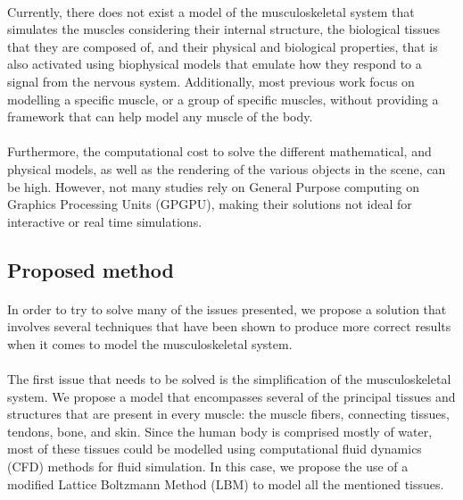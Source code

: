 \paragraph{}Currently, there does not exist a model of the musculoskeletal system that simulates the muscles considering their internal structure, the biological tissues that they are composed of, and their physical and biological properties, that is also activated using biophysical models that emulate how they respond to a signal from the nervous system. Additionally, most previous work focus on modelling a specific muscle, or a group of specific muscles, without providing a framework that can help model any muscle of the body.

\paragraph{}Furthermore, the computational cost to solve the different mathematical, and physical models, as well as the rendering of the various objects in the scene, can be high. However, not many studies rely on General Purpose computing on Graphics Processing Units (GPGPU), making their solutions not ideal for interactive or real time simulations.

\subsection{Proposed method}

\paragraph{}In order to try to solve many of the issues presented, we propose a solution that involves several techniques that have been shown to produce more correct results when it comes to model the musculoskeletal system. 

\paragraph{}The first issue that needs to be solved is the simplification of the musculoskeletal system. We propose a model that encompasses several of the principal tissues and structures that are present in every muscle: the muscle fibers, connecting tissues, tendons, bone, and skin. Since the human body is comprised mostly of water, most of these tissues could be modelled using computational fluid dynamics (CFD) methods for fluid simulation. In this case, we propose the use of a modified Lattice Boltzmann Method (LBM) to model all the mentioned tissues. 

